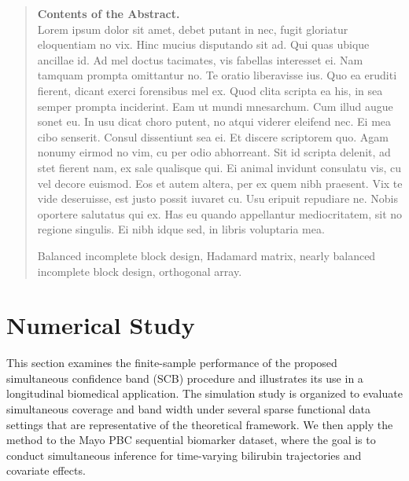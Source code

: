 \documentclass[12pt]{article} %
\renewcommand{\theequation}{\thesection\arabic{equation}}
\theoremstyle{definition}
\begin{document}
\begin{quotation}
{\bf Contents of the Abstract.}\\
Lorem ipsum dolor sit amet, debet putant in nec, fugit gloriatur eloquentiam no vix. Hinc mucius disputando sit ad. Qui quas ubique ancillae id. Ad mel doctus tacimates, vis fabellas interesset ei.
Nam tamquam prompta omittantur no. Te oratio liberavisse ius. Quo ea eruditi fierent, dicant exerci forensibus mel ex. Quod clita scripta ea his, in sea semper prompta inciderint. Eam ut mundi mnesarchum. Cum illud augue sonet eu.
In usu dicat choro putent, no atqui viderer eleifend nec. Ei mea cibo senserit. Consul dissentiunt sea ei. Et discere scriptorem quo. Agam nonumy eirmod no vim, cu per odio abhorreant.
Sit id scripta delenit, ad stet fierent nam, ex sale qualisque qui. Ei animal invidunt consulatu vis, cu vel decore euismod. Eos et autem altera, per ex quem nibh praesent. Vix te vide deseruisse, est justo possit iuvaret cu.
Usu eripuit repudiare ne. Nobis oportere salutatus qui ex. Has eu quando appellantur mediocritatem, sit no regione singulis. Ei nibh idque sed, in libris voluptaria mea.


\vspace{9pt}
Balanced incomplete block design, Hadamard matrix, nearly balanced incomplete block design, orthogonal array.
\par
\end{quotation}\par



\def\thefigure{\arabic{figure}}
\def\thetable{\arabic{table}}

\renewcommand{\theequation}{\thesection.\arabic{equation}}


\fontsize{12}{14pt plus.8pt minus .6pt}\selectfont




\section{Numerical Study}
\label{sec:numerical-study}

This section examines the finite-sample performance of the proposed
simultaneous confidence band (SCB) procedure and illustrates its use in a
longitudinal biomedical application. The simulation study is organized to
evaluate simultaneous coverage and band width under several sparse functional
data settings that are representative of the theoretical framework. We then
apply the method to the Mayo PBC sequential biomarker dataset, where the goal is
to conduct simultaneous inference for time-varying bilirubin trajectories and
covariate effects.
\end{document}
